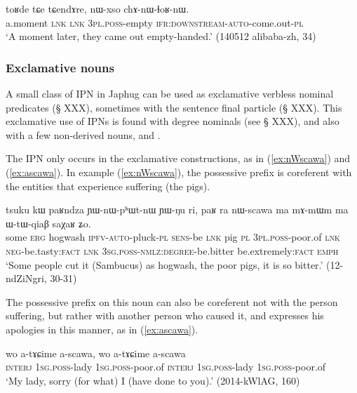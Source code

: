 \begin{exe}
\ex \label{ex:nWxso.chAnWlhoRnW}
\gll toʁde tɕe tɕendɤre, nɯ-xso chɤ-nɯ-ɬoʁ-nɯ. \\
a.moment \textsc{lnk} \textsc{lnk} \textsc{3pl.poss}-empty \textsc{ifr}:\textsc{downstream}-\textsc{auto}-come.out-\textsc{pl} \\
\glt `A moment later, they came out empty-handed.' (140512 alibaba-zh, 34)
\end{exe} 

\subsubsection{Exclamative nouns}
A small class of IPN in Japhug can be used as exclamative verbless nominal predicates (§ XXX), sometimes with the sentence final particle  (§ XXX). This exclamative use of IPNs is found with degree nominals (see § XXX), and also with a few non-derived nouns,  and .

The IPN  only occurs in the exclamative constructions, as in (\ref{ex:nWscawa}) and (\ref{ex:ascawa}). In example (\ref{ex:nWscawa}), the possessive prefix is coreferent with the entities that experience suffering (the pigs).

\begin{exe}
\ex \label{ex:nWscawa} 
\gll tsuku kɯ paʁndza ɲɯ-nɯ-pʰɯt-nɯ ɲɯ-ŋu ri, paʁ ra nɯ-scawa ma mɤ-mɯm ma ɯ-tɯ-qiaβ saχaʁ ʑo. \\
some \textsc{erg} hogwash \textsc{ipfv}-\textsc{auto}-pluck-\textsc{pl} \textsc{sens}-be \textsc{lnk} pig \textsc{pl} \textsc{3pl}.\textsc{poss}-poor.of \textsc{lnk} \textsc{neg}-be.tasty:\textsc{fact} \textsc{lnk} \textsc{3sg}.\textsc{poss}-\textsc{nmlz}:\textsc{degree}-be.bitter be.extremely:\textsc{fact} \textsc{emph} \\
\glt `Some people cut it (Sambucus) as hogwash, the poor pigs, it is so bitter.' (12-ndZiNgri, 30-31)
\end{exe}

The possessive prefix on this noun can also be coreferent not with the person suffering, but rather with another person who caused it, and expresses his apologies in this manner, as in (\ref{ex:ascawa}).

\begin{exe}
\ex \label{ex:ascawa}
\gll wo a-tɤɕime a-scawa, wo a-tɤɕime a-scawa \\
\textsc{interj} \textsc{1sg}.\textsc{poss}-lady \textsc{1sg}.\textsc{poss}-poor.of \textsc{interj} \textsc{1sg}.\textsc{poss}-lady \textsc{1sg}.\textsc{poss}-poor.of  \\ 
\glt `My lady, sorry (for what) I (have done to you).' (2014-kWlAG, 160)
\end{exe}


